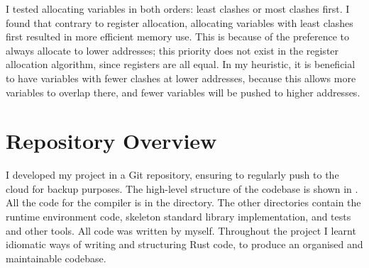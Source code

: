 \documentclass[00-main.tex]{subfiles}
\begin{document}
I tested allocating variables in both orders: least clashes or most clashes first.
I found that contrary to register allocation, allocating variables with least clashes first resulted in more efficient memory use.
This is because of the preference to always allocate to lower addresses; this priority does not exist in the register allocation algorithm, since registers are all equal.
In my heuristic, it is beneficial to have variables with fewer clashes at lower addresses, because this allows more variables to overlap there, and fewer variables will be pushed to higher addresses.



\FloatBarrier %

\vspace{-1ex} %
\section{Repository Overview}

I developed my project in a Git repository, ensuring to regularly push to the cloud for backup purposes.
The high-level structure of the codebase is shown in .
All the code for the compiler is in the  directory.
The other directories contain the runtime environment code, skeleton standard library implementation, and tests and other tools.
All code was written by myself.
Throughout the project I learnt idiomatic ways of writing and structuring Rust code, to produce an organised and maintainable codebase.

\newlength\IndentWidth\setlength\IndentWidth{1em}
\end{document}
